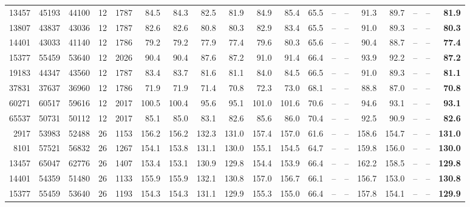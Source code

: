 \begin{table}[t]
{\begin{tabular}{@{}rrrr|rrrrrrr|rrrrrrr|r@{}}
13457 & 45193 & 44100 & 12 & 1787 & 84.5 & 84.3 & 82.5 & 81.9 & 84.9 & 85.4 & 65.5 & -- & -- & 91.3 & 89.7 & -- & -- & \textbf{81.9}\\
13807 & 43837 & 43036 & 12 & 1787 & 82.6 & 82.6 & 80.8 & 80.3 & 82.9 & 83.4 & 65.5 & -- & -- & 91.0 & 89.3 & -- & -- & \textbf{80.3}\\
14401 & 43033 & 41140 & 12 & 1786 & 79.2 & 79.2 & 77.9 & 77.4 & 79.6 & 80.3 & 65.6 & -- & -- & 90.4 & 88.7 & -- & -- & \textbf{77.4}\\
15377 & 55459 & 53640 & 12 & 2026 & 90.4 & 90.4 & 87.6 & 87.2 & 91.0 & 91.4 & 66.4 & -- & -- & 93.9 & 92.2 & -- & -- & \textbf{87.2}\\
19183 & 44347 & 43560 & 12 & 1787 & 83.4 & 83.7 & 81.6 & 81.1 & 84.0 & 84.5 & 66.5 & -- & -- & 91.0 & 89.3 & -- & -- & \textbf{81.1}\\
37831 & 37637 & 36960 & 12 & 1786 & 71.9 & 71.9 & 71.4 & 70.8 & 72.3 & 73.0 & 68.1 & -- & -- & 88.8 & 87.0 & -- & -- & \textbf{70.8}\\
60271 & 60517 & 59616 & 12 & 2017 & 100.5 & 100.4 & 95.6 & 95.1 & 101.0 & 101.6 & 70.6 & -- & -- & 94.6 & 93.1 & -- & -- & \textbf{93.1}\\
65537 & 50731 & 50112 & 12 & 2017 & 85.1 & 85.0 & 83.1 & 82.6 & 85.6 & 86.0 & 70.4 & -- & -- & 92.5 & 90.9 & -- & -- & \textbf{82.6}\\
2917 & 53983 & 52488 & 26 & 1153 & 156.2 & 156.2 & 132.3 & 131.0 & 157.4 & 157.0 & 61.6 & -- & -- & 158.6 & 154.7 & -- & -- & \textbf{131.0}\\
8101 & 57521 & 56832 & 26 & 1267 & 154.1 & 153.8 & 131.1 & 130.0 & 155.1 & 154.5 & 64.7 & -- & -- & 159.8 & 156.0 & -- & -- & \textbf{130.0}\\
13457 & 65047 & 62776 & 26 & 1407 & 153.4 & 153.1 & 130.9 & 129.8 & 154.4 & 153.9 & 66.4 & -- & -- & 162.2 & 158.5 & -- & -- & \textbf{129.8}\\
14401 & 54359 & 51480 & 26 & 1133 & 155.9 & 155.9 & 132.1 & 130.8 & 157.0 & 156.7 & 66.1 & -- & -- & 156.7 & 153.0 & -- & -- & \textbf{130.8}\\
15377 & 55459 & 53640 & 26 & 1193 & 154.3 & 154.3 & 131.1 & 129.9 & 155.3 & 155.0 & 66.4 & -- & -- & 157.8 & 154.1 & -- & -- & \textbf{129.9}\\
\bottomrule\end{tabular}}\end{table}
